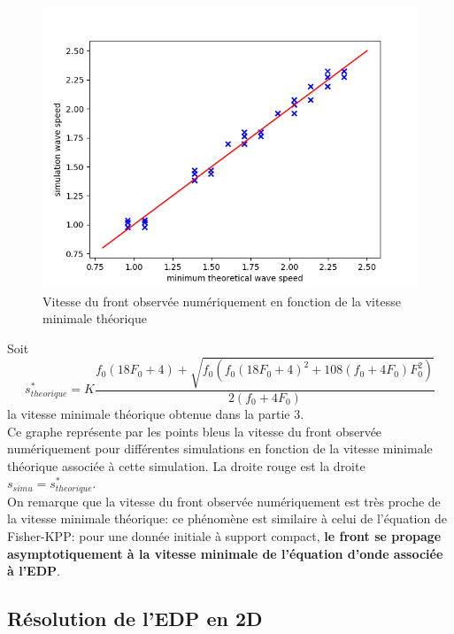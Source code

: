 \documentclass[11pt]{article}
\begin{document}
\newpage
 
\begin{figure}[hbt!]
\centering
\includegraphics[width=.7\textwidth]{Images/stheoriquevssimulations.png}
\caption{Vitesse du front observée numériquement en fonction de la vitesse minimale théorique}
\end{figure}
Soit \begin{equation*}
s^*_{theorique} =K\frac{f_0(18F_0+4)+\sqrt{f_0(f_0(18F_0+4)^2+108(f_0+4F_0)F_0^2)}}{2(f_0+4F_0)}\end{equation*} la vitesse minimale théorique obtenue dans la partie 3.\\
Ce graphe représente par les points bleus la vitesse du front observée numériquement pour différentes simulations en fonction de la vitesse minimale théorique associée à cette simulation. La droite rouge est la droite $s_{simu} = s^*_{theorique}$.\\
On remarque que la vitesse du front observée numériquement est très proche de la vitesse minimale théorique: ce phénomène est similaire à celui de l'équation de Fisher-KPP: pour une donnée initiale à support compact, \textbf{le front se propage asymptotiquement à la vitesse minimale de l'équation d'onde associée à l'EDP}.


\newpage
\subsection{Résolution de l'EDP en 2D}
\end{document}
